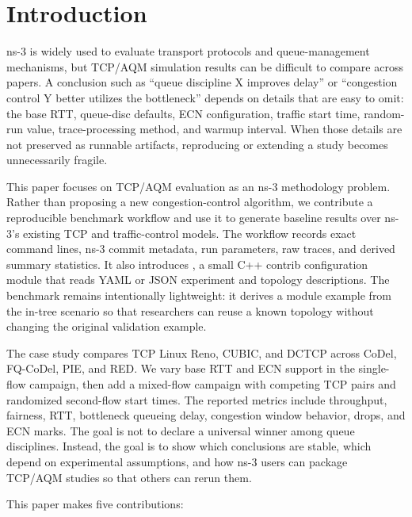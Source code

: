 \section{Introduction}

ns-3 is widely used to evaluate transport protocols and queue-management mechanisms, but TCP/AQM simulation results can be difficult to compare across papers. A conclusion such as ``queue discipline X improves delay'' or ``congestion control Y better utilizes the bottleneck'' depends on details that are easy to omit: the base RTT, queue-disc defaults, ECN configuration, traffic start time, random-run value, trace-processing method, and warmup interval. When those details are not preserved as runnable artifacts, reproducing or extending a study becomes unnecessarily fragile.

This paper focuses on TCP/AQM evaluation as an ns-3 methodology problem. Rather than proposing a new congestion-control algorithm, we contribute a reproducible benchmark workflow and use it to generate baseline results over ns-3's existing TCP and traffic-control models. The workflow records exact command lines, ns-3 commit metadata, run parameters, raw traces, and derived summary statistics. It also introduces \TcpAqmModule{}, a small C++ contrib configuration module that reads YAML or JSON experiment and topology descriptions.\CodeArtifactPaths{} The benchmark remains intentionally lightweight: it derives a module example from the in-tree \TcpValidation{} scenario so that researchers can reuse a known topology without changing the original validation example.

The case study compares TCP Linux Reno, CUBIC, and DCTCP across CoDel, FQ-CoDel, PIE, and RED. We vary base RTT and ECN support in the single-flow campaign, then add a mixed-flow campaign with competing TCP pairs and randomized second-flow start times. The reported metrics include throughput, fairness, RTT, bottleneck queueing delay, congestion window behavior, drops, and ECN marks. The goal is not to declare a universal winner among queue disciplines. Instead, the goal is to show which conclusions are stable, which depend on experimental assumptions, and how ns-3 users can package TCP/AQM studies so that others can rerun them.

This paper makes five contributions:

